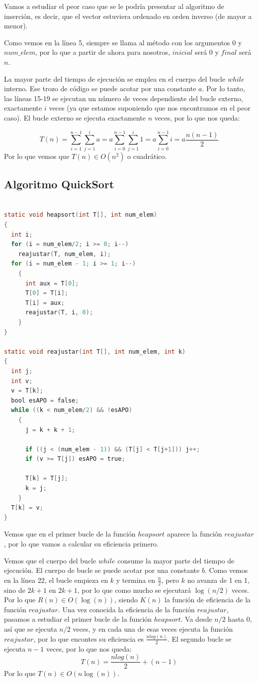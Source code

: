 Vamos a estudiar el peor caso que se le podría presentar al algoritmo de inserción, es decir, que el vector estuviera ordenado en orden inverso (de mayor a menor).

Como vemos en la línea 5, siempre se llama al método con los argumentos $0$ y $num\_elem$, por lo que a partir de ahora para nosotros, $inicial$ será $0$ y $final$ será $n$.

La mayor parte del tiempo de ejecución se emplea en el cuerpo del bucle $while$ interno. Ese trozo de código se puede acotar por una constante $a$. Por lo tanto, las líneas 15-19 se ejecutan un número de veces dependiente del bucle externo, exactamente $i$ veces (ya que estamos suponiendo que nos encontramos en el peor caso). El bucle externo se ejecuta exactamente $n$ veces, por lo que nos queda:

\[T(n)=\sum_{i=1}^{n-1}\sum_{j=1}^{i}a=a\sum_{i=0}^{n-1}\sum_{j=1}^{i}1=a\sum_{i=0}^{n-1}i=a\frac{n(n-1)}{2}\]
Por lo que vemos que $T(n)\in O(n^2)$ o cuadrático.

\subsection{Algoritmo QuickSort}
\begin{lstlisting}[language=C]

static void heapsort(int T[], int num_elem)
{
  int i;
  for (i = num_elem/2; i >= 0; i--)
    reajustar(T, num_elem, i);
  for (i = num_elem - 1; i >= 1; i--)
    {
      int aux = T[0];
      T[0] = T[i];
      T[i] = aux;
      reajustar(T, i, 0);
    }
} 

static void reajustar(int T[], int num_elem, int k)
{
  int j;
  int v;
  v = T[k];
  bool esAPO = false;
  while ((k < num_elem/2) && !esAPO)
    {
      j = k + k + 1;

      if ((j < (num_elem - 1)) && (T[j] < T[j+1])) j++;
      if (v >= T[j]) esAPO = true;
      
      T[k] = T[j];
      k = j;
    }
  T[k] = v;
}
\end{lstlisting}

Vemos que en el primer bucle de la función $heapsort$ aparece la función $reajustar$, por lo que vamos a calcular su eficiencia primero. 

Vemos que el cuerpo del bucle $while$ consume la mayor parte del tiempo de ejecución. El cuerpo de bucle se puede acotar por una constante $b$. Como vemos en la línea 22, el bucle empieza en $k$ y termina en $\frac{n}{2}$, pero $k$ no avanza de 1 en 1, sino de $2k+1$ en $2k+1$, por lo que como mucho se ejecutará $\log(n/2)$ veces. Por lo que $R(n) \in O(\log(n))$, siendo $K(n)$ la función de eficiencia de la función $reajustar$.
Una vez conocida la eficiencia de la función $reajustar$, pasamos a estudiar el primer bucle de la función $heapsort$. Va desde $n/2$ hasta $0$, así que se ejecuta $n/2$ veces, y en cada una de esas veces ejecuta la función $reajustar$, por lo que encontes su eficiencia es $\frac{nlog(n)}{2}$. El segundo bucle se ejecuta $n-1$ veces, por lo que nos queda:
\[T(n)=\frac{nlog(n)}{2}+(n-1)\]
Por lo que $T(n)\in O(n\log(n))$.

